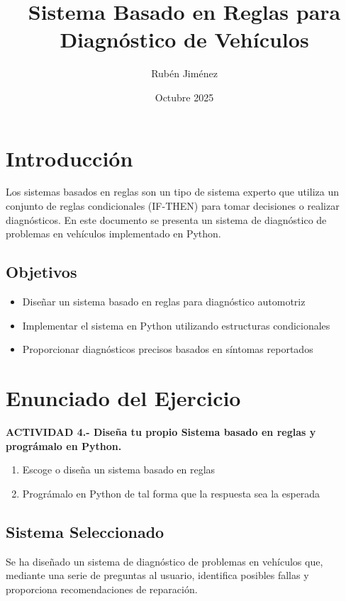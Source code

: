 \documentclass[12pt]{article}
\title{Sistema Basado en Reglas para Diagnóstico de Vehículos}
\author{Rubén Jiménez}
\date{Octubre 2025}
\begin{document}
\maketitle
\tableofcontents
\newpage

\section{Introducción}

Los sistemas basados en reglas son un tipo de sistema experto que utiliza un conjunto de reglas condicionales (IF-THEN) para tomar decisiones o realizar diagnósticos. En este documento se presenta un sistema de diagnóstico de problemas en vehículos implementado en Python.

\subsection{Objetivos}
\begin{itemize}
    \item Diseñar un sistema basado en reglas para diagnóstico automotriz
    \item Implementar el sistema en Python utilizando estructuras condicionales
    \item Proporcionar diagnósticos precisos basados en síntomas reportados
\end{itemize}

\section{Enunciado del Ejercicio}

\textbf{ACTIVIDAD 4.- Diseña tu propio Sistema basado en reglas y prográmalo en Python.}

\begin{enumerate}
    \item Escoge o diseña un sistema basado en reglas
    \item Prográmalo en Python de tal forma que la respuesta sea la esperada
\end{enumerate}

\subsection{Sistema Seleccionado}
Se ha diseñado un sistema de diagnóstico de problemas en vehículos que, mediante una serie de preguntas al usuario, identifica posibles fallas y proporciona recomendaciones de reparación.
\end{document}
